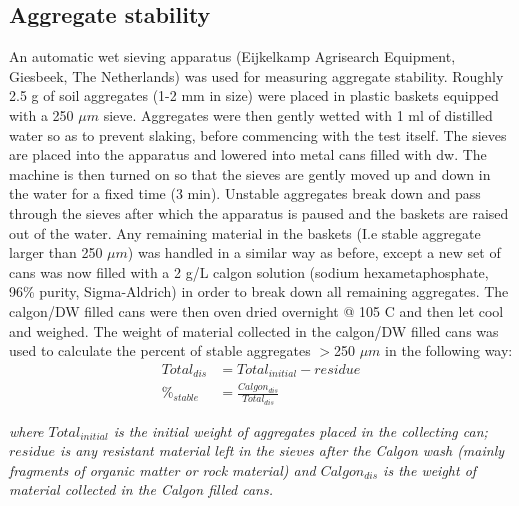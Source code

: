     \subsection{Aggregate stability}

    	An automatic wet sieving apparatus (Eijkelkamp Agrisearch Equipment, Giesbeek, The Netherlands) was used for measuring aggregate stability. Roughly 2.5 g of soil aggregates (1-2 mm in size) were placed in plastic baskets equipped with a 250 $ \mu m $ sieve. Aggregates were then gently wetted with 1 ml of distilled water so as to prevent slaking, before commencing with the test itself. The sieves are  placed into the apparatus and lowered into metal cans filled with \gls{dw}. The machine is then turned on so that the sieves are gently moved up and down in the water for a fixed time (3 min). Unstable aggregates break down and pass through the sieves after which the apparatus is paused and the baskets are raised out of the water. Any remaining material in the baskets (I.e stable aggregate larger than 250 $ \mu m $) was handled in a similar way as before, except a new set of cans was now filled with a 2 g/L calgon solution (sodium hexametaphosphate, 96\% purity, Sigma-Aldrich) in order to break down all remaining aggregates. The calgon/DW filled cans were then oven dried overnight @ 105 C and  then let cool and weighed. The weight of material collected in the calgon/DW filled cans was used to calculate the percent of stable aggregates $ > $250 $ \mu m $ in the following way:\\

    	\begin{align}
    	Total_{dis} &= Total_{initial} - residue\\
    	\%_{stable} &= \frac{Calgon_{dis}}{Total_{dis}}
    	\end{align}

    	\begin{adjustwidth}{50pt}{50pt}
    		\begin{footnotesize}
    			\textit{where $ Total_{initial} $ is the initial weight of aggregates placed in the collecting can; $ residue $ is any resistant material left in the sieves after the Calgon wash (mainly fragments of organic matter  or rock material) and $ Calgon_{dis} $ is the weight of material collected in the Calgon filled cans.
    			}\\
    		\end{footnotesize}
    	\end{adjustwidth}

